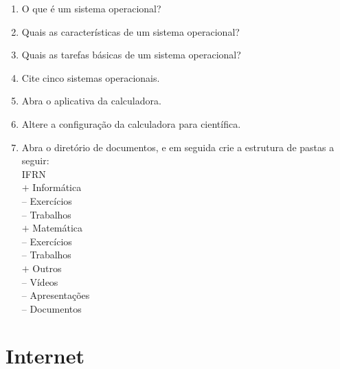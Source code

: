 \documentclass[11pt]{article}
\begin{document}
		\begin{enumerate}
			\item O que é um sistema operacional?
			\item Quais as características de um sistema operacional?
			\item Quais as tarefas básicas de um sistema operacional?
			\item Cite cinco sistemas operacionais.
			\item	Abra o aplicativa da calculadora.
			\item Altere a configura\c cão da calculadora para científica.
			\item Abra o diretório de documentos, e em seguida crie a estrutura de pastas a seguir:\\
IFRN\\
$+$ Informática\\
-- Exercícios\\
-- Trabalhos\\
$+$ Matemática\\
-- Exercícios\\
-- Trabalhos\\
$+$ Outros\\
-- Vídeos\\
-- Apresentações\\
-- Documentos\\
	\end{enumerate}
		
	\newpage
	\section{Internet}
	
	
\end{document}
